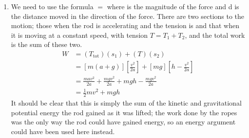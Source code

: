 \begin{problem}
{\begin{enumerate}
\item We need to use the formula  $=$  where  is the magnitude of the force  and d is the distance moved in the direction of the force. There are two sections to the motion; those when the rod is accelerating and the tension is  and that when it is moving at a constant speed, with tension $T = T_{1} + T_{2}$, and the total work is the sum of these two.
	\begin{align*} 
	W &= (T_{\text{tot}})(s_{1}) + (T)(s_{2})  \\ 
	&= \left[m(a + g)\right]\left[\frac{v^{2}}{2a}\right] + \left[mg\right]\left[h - \frac{v^{2}}{2a}\right] \\ 
	&= \frac{mav^{2}}{2a} + \frac{mgv^{2}}{2a} + mgh - \frac{mgv^{2}}{2a} \\ 
	&= \frac{1}{2}mv^{2} + mgh 
	\end{align*}
It should be clear that this is simply the sum of the kinetic and gravitational potential energy the rod gained as it was lifted; the work done by the ropes was the only way the rod could have gained energy, so an energy argument could have been used here instead.
\end{enumerate}}
\end{problem}